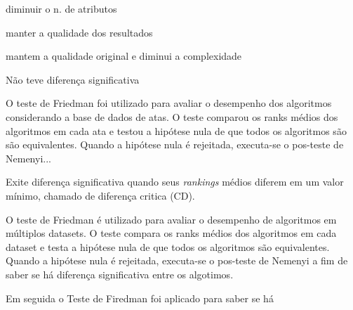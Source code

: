 








diminuir o n. de atributos

manter a qualidade dos resultados

mantem a qualidade original e diminui a complexidade 

Não teve diferença significativa

















%
O teste de Friedman foi utilizado para avaliar o desempenho dos algoritmos considerando a base de dados de atas. 
%
O teste comparou os ranks médios dos algoritmos em cada ata e testou a hipótese nula de que todos os algoritmos são são equivalentes. 
%
Quando a hipótese nula é rejeitada, executa-se o pos-teste de Nemenyi...

Exite diferença significativa quando seus \textit{rankings} médios diferem em um valor mínimo, chamado de diferença critica (CD). 

O teste de Friedman é utilizado para avaliar o desempenho de algoritmos em múltiplos datasets. O teste compara os ranks médios dos algoritmos em cada dataset e testa a hipótese nula de que todos os algoritmos são equivalentes. Quando a hipótese nula é rejeitada, executa-se o pos-teste de Nemenyi a fim de saber se há diferença significativa entre os algotimos.


Em seguida o Teste de Firedman foi aplicado para saber se há









